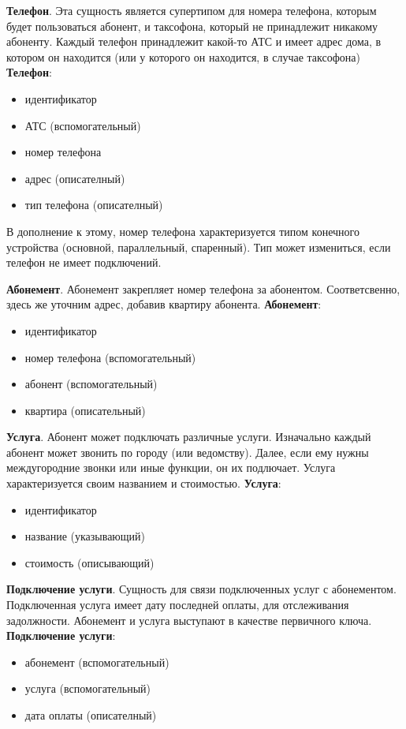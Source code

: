 \documentclass{report}
\begin{document}
\textbf{Телефон}. Эта сущность является супертипом для номера телефона, 
которым будет пользоваться абонент, и таксофона, который не принадлежит
никакому абоненту. Каждый телефон принадлежит какой-то АТС и имеет адрес дома,
в котором он находится (или у которого он находится, в случае таксофона)
\newline\textbf{Телефон}:
\begin{itemize}
    \item идентификатор
    \item АТС (вспомогательный)
    \item номер телефона
    \item адрес (описателный)
    \item тип телефона (описателный)
\end{itemize}
В дополнение к этому, номер телефона характеризуется 
типом конечного устройства (основной, параллельный, спаренный). 
Тип может измениться, если телефон не имеет подключений.

\textbf{Абонемент}. Абонемент закрепляет номер телефона за абонентом.
Соответсвенно, здесь же уточним адрес, добавив квартиру абонента. 
\newline\textbf{Абонемент}:
\begin{itemize}
    \item идентификатор
    \item номер телефона (вспомогательный)
    \item абонент (вспомогательный)
    \item квартира (описательный)
\end{itemize}

\textbf{Услуга}. Абонент может подключать различные услуги. Изначально 
каждый абонент может звонить по городу (или ведомству). Далее, если 
ему нужны междугородние звонки или иные функции, он их подлючает. Услуга
характеризуется своим названием и стоимостью.
\newline\textbf{Услуга}:
\begin{itemize}
    \item идентификатор
    \item название (указывающий)
    \item стоимость (описывающий)
\end{itemize}

\textbf{Подключение услуги}. Сущность для связи подключенных услуг с 
абонементом. Подключенная услуга имеет дату последней оплаты, для отслеживания
задолжности. Абонемент и услуга выступают в качестве первичного ключа.
\newline\textbf{Подключение услуги}:
\begin{itemize}
    \item абонемент (вспомогательный)
    \item услуга (вспомогательный)
    \item дата оплаты (описателный)
\end{itemize}
\end{document}
